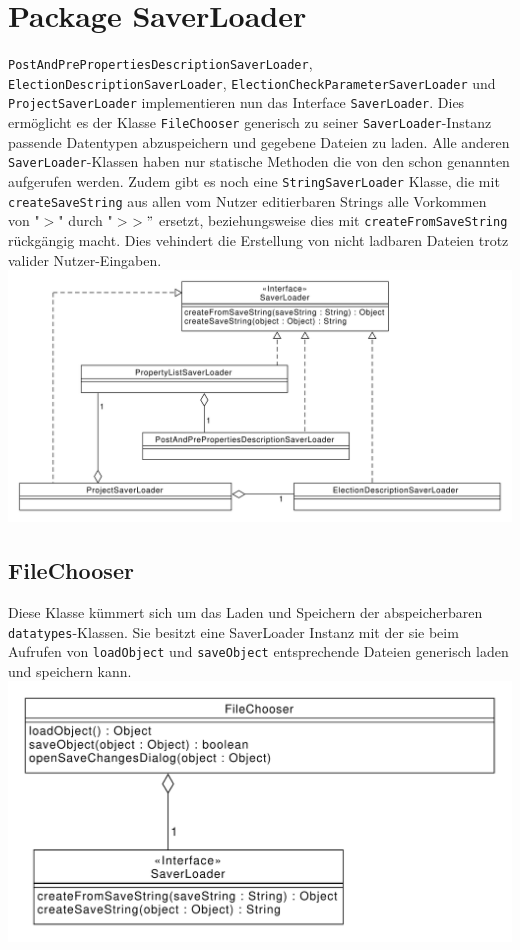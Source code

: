 \documentclass[a4paper]{scrreprt}
\begin{document}
\section{Package SaverLoader}
\verb!PostAndPrePropertiesDescriptionSaverLoader!, \verb!ElectionDescriptionSaverLoader!, \verb!ElectionCheckParameterSaverLoader! und \verb!ProjectSaverLoader! implementieren nun das Interface \verb!SaverLoader!. Dies ermöglicht es der Klasse \verb!FileChooser! generisch zu seiner \verb!SaverLoader!-Instanz passende Datentypen abzuspeichern und gegebene Dateien zu laden.
Alle anderen \verb!SaverLoader!-Klassen haben nur statische Methoden die von den schon genannten aufgerufen werden.
Zudem gibt es noch eine \verb!StringSaverLoader! Klasse, die mit \verb!createSaveString! aus allen vom Nutzer editierbaren Strings alle Vorkommen von "$>$" durch "$>$$>"$ ersetzt, beziehungsweise dies mit \verb!createFromSaveString! rückgängig macht. Dies vehindert die Erstellung von nicht ladbaren Dateien trotz valider Nutzer-Eingaben.\\
\includegraphics[scale=0.5]{SaverLoader.pdf}

\subsection{FileChooser}
Diese Klasse kümmert sich um das Laden und Speichern der abspeicherbaren \verb!datatypes!-Klassen. Sie besitzt eine SaverLoader Instanz mit der sie beim Aufrufen von \verb!loadObject! und \verb!saveObject! entsprechende Dateien generisch laden und speichern kann.
\\
\includegraphics[scale=0.5]{FileChooser.pdf}
\end{document}

